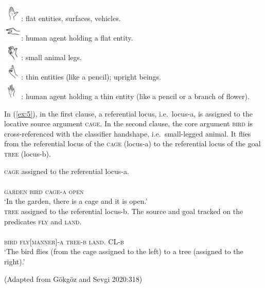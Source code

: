 \documentclass[]{elsarticle} %
\begin{document}
\begin{exe}
\ex \label{ex:4}
\includegraphics[width=25pt]{pictures/flathand.png}: flat entities, surfaces, vehicles.\\
\includegraphics[width=25pt]{pictures/flat.png}: human agent holding a flat entity.\\
\includegraphics[width=25pt]{pictures/small_legged.png}: small animal legs.\\
\includegraphics[width=25pt]{pictures/index.png}: thin entities (like a pencil); upright beings.\\
\includegraphics[width=25pt]{pictures/hold.png}: human agent holding a thin entity (like a pencil or a branch of flower). 
\end{exe}

In (\ref{ex:5}), in the first clause, a referential locus, i.e.~locus-a,
is assigned to the locative source argument \textsc{cage}. In the second
clause, the core argument \textsc{bird} is cross-referenced with the
classifier handshape, i.e.~small-legged animal. It flies from the
referential locus of the \textsc{cage} (locus-a) to the referential
locus of the goal \textsc{tree} (locus-b).

\begin{exe}
    \ex \label{ex:5}
\begin{xlist}
    \ex \textsc{cage} assigned to the referential locus-a. \\ \\
    \textsc{garden bird cage-a open} \\
    ‘In the garden, there is a cage and it is open.’
    \\
    
    \ex \textsc{tree} assigned to the referential locus-b. The source and goal tracked on the predicates \textsc{fly} and \textsc{land}. \\ \\
    \textsc{bird fly[manner]-a tree-b land. CL-b}\\
    ‘The bird flies (from the cage assigned to the left) to a tree (assigned to the right).’
    \end{xlist}
    \end{exe}
    \hfill (Adapted from Gökgöz and Sevgi 2020:318)
\end{document}
